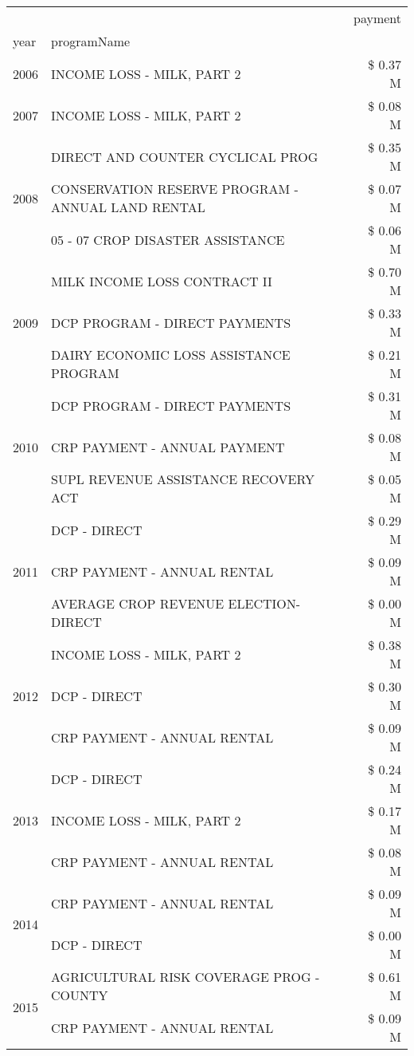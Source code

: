 \begin{tabular}{llr}
\toprule
 &  & payment \\
year & programName &  \\
\midrule
2006 & INCOME LOSS - MILK, PART 2 & \$ 0.37 M \\
\cline{1-3}
2007 & INCOME LOSS - MILK, PART 2 & \$ 0.08 M \\
\cline{1-3}
\multirow[t]{3}{*}{2008} & DIRECT AND COUNTER CYCLICAL PROG & \$ 0.35 M \\
 & CONSERVATION RESERVE PROGRAM - ANNUAL LAND RENTAL & \$ 0.07 M \\
 & 05 - 07 CROP DISASTER ASSISTANCE & \$ 0.06 M \\
\cline{1-3}
\multirow[t]{3}{*}{2009} & MILK INCOME LOSS CONTRACT II & \$ 0.70 M \\
 & DCP PROGRAM - DIRECT PAYMENTS & \$ 0.33 M \\
 & DAIRY ECONOMIC LOSS ASSISTANCE PROGRAM & \$ 0.21 M \\
\cline{1-3}
\multirow[t]{3}{*}{2010} & DCP PROGRAM - DIRECT PAYMENTS & \$ 0.31 M \\
 & CRP PAYMENT - ANNUAL PAYMENT & \$ 0.08 M \\
 & SUPL REVENUE ASSISTANCE RECOVERY ACT & \$ 0.05 M \\
\cline{1-3}
\multirow[t]{3}{*}{2011} & DCP - DIRECT & \$ 0.29 M \\
 & CRP PAYMENT - ANNUAL RENTAL & \$ 0.09 M \\
 & AVERAGE CROP REVENUE ELECTION-DIRECT & \$ 0.00 M \\
\cline{1-3}
\multirow[t]{3}{*}{2012} & INCOME LOSS - MILK, PART 2 & \$ 0.38 M \\
 & DCP - DIRECT & \$ 0.30 M \\
 & CRP PAYMENT - ANNUAL RENTAL & \$ 0.09 M \\
\cline{1-3}
\multirow[t]{3}{*}{2013} & DCP - DIRECT & \$ 0.24 M \\
 & INCOME LOSS - MILK, PART 2 & \$ 0.17 M \\
 & CRP PAYMENT - ANNUAL RENTAL & \$ 0.08 M \\
\cline{1-3}
\multirow[t]{2}{*}{2014} & CRP PAYMENT - ANNUAL RENTAL & \$ 0.09 M \\
 & DCP - DIRECT & \$ 0.00 M \\
\cline{1-3}
\multirow[t]{2}{*}{2015} & AGRICULTURAL RISK COVERAGE PROG - COUNTY & \$ 0.61 M \\
 & CRP PAYMENT - ANNUAL RENTAL & \$ 0.09 M \\
\cline{1-3}

\end{tabular}
